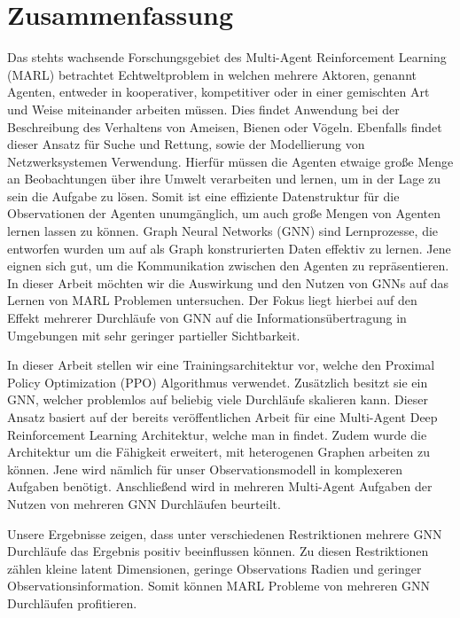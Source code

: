 
\chapter*{Zusammenfassung}

Das stehts wachsende Forschungsgebiet des Multi-Agent Reinforcement Learning (MARL) betrachtet Echtweltproblem in welchen mehrere Aktoren, genannt Agenten, entweder in kooperativer, kompetitiver oder in einer gemischten Art und Weise miteinander arbeiten müssen. Dies findet Anwendung bei der Beschreibung des Verhaltens von Ameisen, Bienen oder Vögeln. Ebenfalls findet dieser Ansatz für Suche und Rettung, sowie der Modellierung von Netzwerksystemen Verwendung. Hierfür müssen die Agenten etwaige große Menge an Beobachtungen über ihre Umwelt verarbeiten und lernen, um in der Lage zu sein die Aufgabe zu lösen. Somit ist eine effiziente Datenstruktur für die Observationen der Agenten unumgänglich, um auch große Mengen von Agenten lernen lassen zu können. 
Graph Neural Networks (GNN) sind Lernprozesse, die entworfen wurden um auf als Graph konstrurierten Daten effektiv zu lernen. Jene eignen sich gut, um die Kommunikation zwischen den Agenten zu repräsentieren. In dieser Arbeit möchten wir die Auswirkung und den Nutzen von GNNs auf das Lernen von MARL Problemen untersuchen. Der Fokus liegt hierbei auf den Effekt mehrerer Durchläufe von GNN auf die Informationsübertragung in Umgebungen mit sehr geringer partieller Sichtbarkeit.\par

In dieser Arbeit stellen wir eine Trainingsarchitektur vor, welche den Proximal Policy Optimization (PPO) Algorithmus verwendet. Zusätzlich besitzt sie ein GNN, welcher problemlos auf beliebig viele Durchläufe skalieren kann. Dieser Ansatz basiert auf der bereits veröffentlichen Arbeit für eine Multi-Agent Deep Reinforcement Learning Architektur, welche man in \citet{RobinRuede2021} findet. Zudem wurde die Architektur um die Fähigkeit erweitert, mit heterogenen Graphen arbeiten zu können. Jene wird nämlich für unser Observationsmodell in komplexeren Aufgaben benötigt. Anschließend wird in mehreren Multi-Agent Aufgaben der Nutzen von mehreren GNN Durchläufen beurteilt.\par

Unsere Ergebnisse zeigen, dass unter verschiedenen Restriktionen mehrere GNN Durchläufe das Ergebnis positiv beeinflussen können. Zu diesen Restriktionen zählen kleine latent Dimensionen, geringe Observations Radien und geringer Observationsinformation. Somit können MARL Probleme von mehreren GNN Durchläufen profitieren.